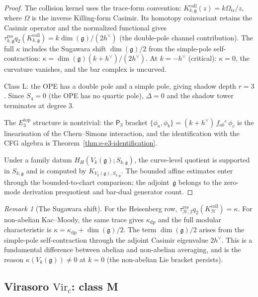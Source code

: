 \documentclass[11pt,reqno]{amsart}
\theoremstyle{definition}
\theoremstyle{remark}
\newtheorem{remark}[theorem]{Remark}
\providecommand{\fg}{\mathfrak{g}}
\providecommand{\Ethree}{E_3}
\providecommand{\Pthree}{\mathsf{P}_3}
\begin{document}
\begin{proof}
The collision kernel uses the trace-form convention:
$K_{k,\fg}^{\mathrm{coll}}(z)=k\Omega_{\mathrm{tr}}/z$, where
$\Omega$ is the inverse Killing-form Casimir. Its homotopy coinvariant
retains the Casimir operator and the normalized functional gives
$\tau_{k,\fg}^{\mathrm{res}}q_2(K_{k,\fg}^{\mathrm{coll}})
=k\dim(\fg)/(2h^\vee)$ (the double-pole channel contribution).
The full $\kappa$ includes the
Sugawara shift $\dim(\fg)/2$ from the simple-pole
self-contraction:
$\kappa = \dim(\fg)(k + h^\vee)/(2h^\vee)$.
At $k = -h^\vee$ (critical): $\kappa = 0$, the curvature
vanishes, and the bar complex is uncurved.

Class L: the OPE has a double pole and a simple pole, giving
shadow depth $r = 3$. Since $S_4 = 0$ (the OPE has no quartic
pole), $\Delta = 0$ and the shadow tower terminates at degree
$3$.

The $\Ethree^{\mathrm{top}}$ structure is nontrivial: the
$\Pthree$ bracket
$\{\phi_a, \phi_b\} = (k + h^\vee)\,f_{ab}{}^c\,\phi_c$
is the linearisation of the Chern--Simons interaction, and
the identification with the CFG algebra is
Theorem~\ref{thm:e-e3-identification}.

Under a family datum $H_H(V_k(\fg);S_{k,\fg})$, the curve-level
quotient is supported in $S_{k,\fg}$ and is computed by
$K_{V_k(\fg),S_{k,\fg}}$.  The bounded affine estimates enter through
the bounded-to-chart comparison; the adjoint~$\fg$ belongs to the
zero-mode derivation prequotient and bar-dual generator count.
\end{proof}

\begin{remark}[The Sugawara shift]
\label{rem:e-sugawara-shift}
For the Heisenberg row,
$\tau_{\mathcal H,2}^{\mathrm{res}}q_2(K_{\mathcal H}^{\mathrm{coll}})
=\kappa$. For non-abelian Kac--Moody, the same trace gives
$\kappa_{\mathrm{dp}}$ and the full modular characteristic is
$\kappa=\kappa_{\mathrm{dp}}+\dim(\fg)/2$. The term
$\dim(\fg)/2$ arises from the simple-pole self-contraction
through the adjoint Casimir eigenvalue $2h^\vee$. This is a
fundamental difference between abelian and non-abelian
averaging, and is the reason $\kappa(V_k(\fg)) \neq 0$ at
$k = 0$ (the non-abelian Lie bracket persists).
\end{remark}

\subsection{Virasoro $\mathrm{Vir}_c$: class M}
\end{document}
